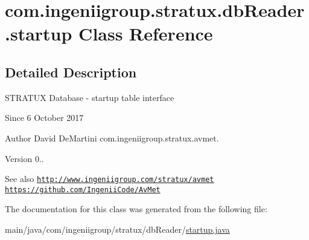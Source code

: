 \hypertarget{classcom_1_1ingeniigroup_1_1stratux_1_1db_reader_1_1startup}{}\section{com.\+ingeniigroup.\+stratux.\+db\+Reader.\+startup Class Reference}
\label{classcom_1_1ingeniigroup_1_1stratux_1_1db_reader_1_1startup}


\subsection{Detailed Description}
S\+T\+R\+A\+T\+UX Database -\/ startup table interface

\begin{DoxySince}{Since}
6 October 2017 
\end{DoxySince}
\begin{DoxyAuthor}{Author}
David De\+Martini  com.\+ingeniigroup.\+stratux.\+avmet. 
\end{DoxyAuthor}
\begin{DoxyVersion}{Version}
0.. 
\end{DoxyVersion}
\begin{DoxySeeAlso}{See also}
\href{http://www.ingeniigroup.com/stratux/avmet}{\tt http\+://www.\+ingeniigroup.\+com/stratux/avmet}  \href{https://github.com/IngeniiCode/AvMet}{\tt https\+://github.\+com/\+Ingenii\+Code/\+Av\+Met} 
\end{DoxySeeAlso}


The documentation for this class was generated from the following file\+:\begin{DoxyCompactItemize}
\item 
main/java/com/ingeniigroup/stratux/db\+Reader/\hyperlink{startup_8java}{startup.\+java}\end{DoxyCompactItemize}

